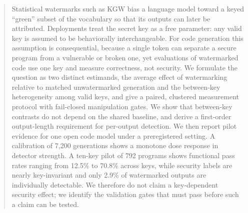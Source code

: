 \begin{abstract}
Statistical watermarks such as KGW bias a language model toward a keyed ``green'' subset of the vocabulary so that its outputs can later be attributed. Deployments treat the secret key as a free parameter: any valid key is assumed to be behaviorally interchangeable. For code generation this assumption is consequential, because a single token can separate a secure program from a vulnerable or broken one, yet evaluations of watermarked code use one key and measure correctness, not security. We formulate the question as two distinct estimands, the average effect of watermarking relative to matched unwatermarked generation and the between-key heterogeneity among valid keys, and give a paired, clustered measurement protocol with fail-closed manipulation gates. We show that between-key contrasts do not depend on the shared baseline, and derive a first-order output-length requirement for per-output detection. We then report pilot evidence for one open code model under a preregistered setting. A calibration of 7,200 generations shows a monotone dose response in detector strength. A ten-key pilot of 792 programs shows functional pass rates ranging from 12.5\% to 70.8\% across keys, while security labels are nearly key-invariant and only 2.9\% of watermarked outputs are individually detectable. We therefore do not claim a key-dependent security effect; we identify the validation gates that must pass before such a claim can be tested.
\end{abstract}
